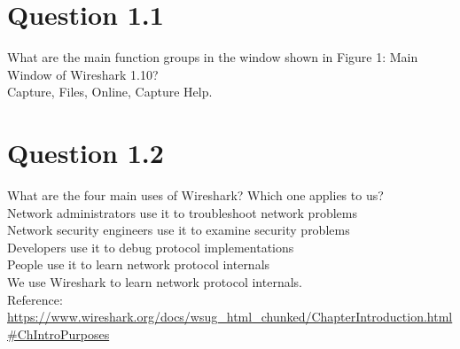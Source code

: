 \documentclass{article}
\newenvironment{homeworkProblem}[1]{
	\section*{#1}
	}{
}
\begin{document}
\newpage


\begin{homeworkProblem}{Question 1.1}
What are the main function groups in the window shown in Figure 1: Main Window of Wireshark 1.10?\\

Capture, Files, Online, Capture Help.
\end{homeworkProblem}


\begin{homeworkProblem}{Question 1.2}
What are the four main uses of Wireshark? Which one applies to us?\\

Network administrators use it to troubleshoot network problems\\
Network security engineers use it to examine security problems\\
Developers use it to debug protocol implementations\\
People use it to learn network protocol internals\\

We use Wireshark to learn network protocol internals.\\

Reference:\\
\url{https://www.wireshark.org/docs/wsug_html_chunked/ChapterIntroduction.html#ChIntroPurposes}
\end{homeworkProblem}

\end{document}
